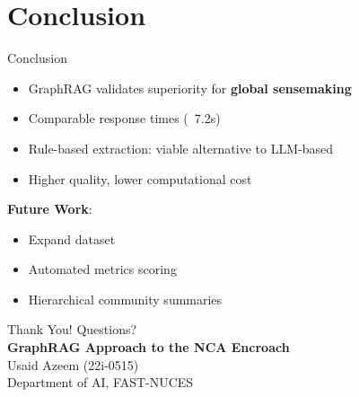 \documentclass{beamer}
\begin{document}
\section{Conclusion}
\begin{frame}{Conclusion}
\begin{itemize}
\item GraphRAG validates superiority for \textbf{global sensemaking}
\item Comparable response times (~7.2s)
\item Rule-based extraction: viable alternative to LLM-based
\item Higher quality, lower computational cost
\end{itemize}
\vspace{0.5cm}
\textbf{Future Work}:
\begin{itemize}
\item Expand dataset
\item Automated metrics scoring
\item Hierarchical community summaries
\end{itemize}
\end{frame}

\begin{frame}{Thank You!}
\centering
\Large{Questions?}\\[0.5cm]
\textbf{GraphRAG Approach to the NCA Encroach}\\[0.3cm]
Usaid Azeem (22i-0515)\\
Department of AI, FAST-NUCES
\end{frame}
\end{document}
